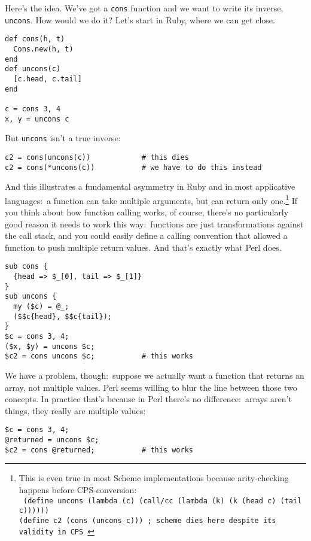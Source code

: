 \documentclass{article}
\begin{document}
Here's the idea. We've got a {\tt cons} function and we want to write its
inverse, {\tt uncons}. How would we do it? Let's start in Ruby, where we can
get close.

\begin{verbatim}
def cons(h, t)
  Cons.new(h, t)
end
def uncons(c)
  [c.head, c.tail]
end

c = cons 3, 4
x, y = uncons c
\end{verbatim}

But {\tt uncons} isn't a true inverse:

\begin{verbatim}
c2 = cons(uncons(c))            # this dies
c2 = cons(*uncons(c))           # we have to do this instead
\end{verbatim}

And this illustrates a fundamental asymmetry in Ruby and in most applicative
languages:~a function can take multiple arguments, but can return only
one.\footnote{This is even true in most Scheme implementations because
arity-checking happens before CPS-conversion: \\
{\tt
(define uncons (lambda (c) (call/cc (lambda (k) (k (head c) (tail c)))))) \\
(define c2 (cons (uncons c)))   ; scheme dies here despite its validity in CPS
}}
If you think about how function calling works, of course, there's no
particularly good reason it needs to work this way:~functions are just
transformations against the call stack, and you could easily define a calling
convention that allowed a function to push multiple return values. And that's
exactly what Perl does.

\begin{verbatim}
sub cons {
  {head => $_[0], tail => $_[1]}
}
sub uncons {
  my ($c) = @_;
  ($$c{head}, $$c{tail});
}
$c = cons 3, 4;
($x, $y) = uncons $c;
$c2 = cons uncons $c;           # this works
\end{verbatim}

We have a problem, though:~suppose we actually want a function that returns an
array, not multiple values. Perl seems willing to blur the line between those
two concepts. In practice that's because in Perl there's no difference:~arrays
aren't things, they really are multiple values:

\begin{verbatim}
$c = cons 3, 4;
@returned = uncons $c;
$c2 = cons @returned;           # this works
\end{verbatim}
\end{document}
